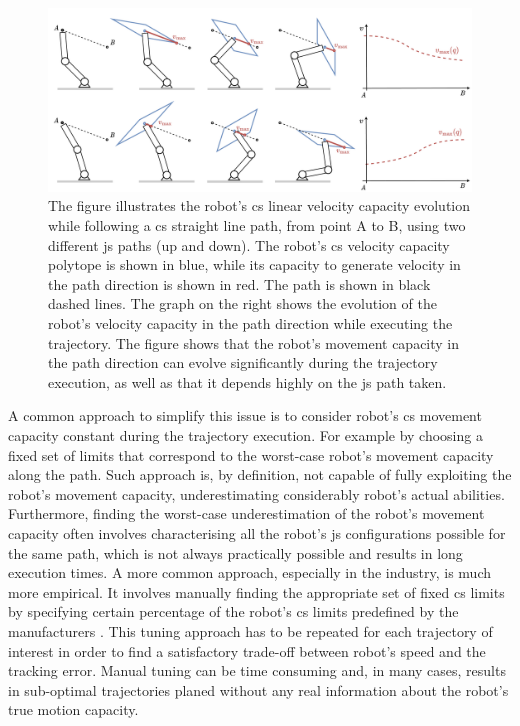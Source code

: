 \begin{figure}[!t]
    \centering 
    \includegraphics[width=\linewidth]{Papers/imgs/motivation_topca.pdf}
    \caption{The figure illustrates the robot's \gls{cs} linear velocity capacity evolution while following a \gls{cs} straight line path, from point A to B, using two different \gls{js} paths (up and down). The robot's \gls{cs} velocity capacity polytope is shown in blue, while its capacity to generate velocity in the path direction is shown in red. The path is shown in black dashed lines. The graph on the right shows the evolution of the robot's velocity capacity in the path direction while executing the trajectory. The figure shows that the robot's movement capacity in the path direction can evolve significantly during the trajectory execution, as well as that it depends highly on the \gls{js} path taken. }
    \label{fig:motiv_topca}
\end{figure}

A common approach to simplify this issue is to consider robot's \gls{cs} movement capacity constant during the trajectory execution. For example by choosing a fixed set of limits that correspond to the worst-case robot's movement capacity along the path. 
Such approach is, by definition, not capable of fully exploiting the robot's movement capacity, underestimating considerably robot's actual abilities. Furthermore, finding the worst-case underestimation of the robot's movement capacity often involves characterising all the robot's \gls{js} configurations possible for the same path, which is not always practically possible and results in long execution times. 
A more common approach, especially in the industry, is much more empirical. It involves manually finding the appropriate set of fixed \gls{cs} limits by specifying certain percentage of the robot's \gls{cs} limits predefined by the manufacturers \cite{ur3data}\cite{frankadata}. 
This tuning approach has to be repeated for each trajectory of interest in order to find a satisfactory trade-off between robot's speed and the tracking error. Manual tuning can be time consuming and, in many cases, results in sub-optimal trajectories planed without any real information about the robot's true motion capacity. 

